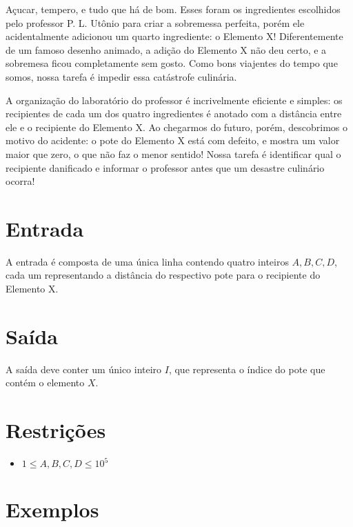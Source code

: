 Açucar, tempero, e tudo que há de bom. Esses foram os ingredientes escolhidos pelo professor P. L. Utônio para criar a sobremessa perfeita,
porém ele acidentalmente adicionou um quarto ingrediente: o Elemento X! Diferentemente de um famoso desenho animado, a adição do Elemento X não deu certo,
e a sobremesa ficou completamente sem gosto. Como bons viajentes do tempo que somos, nossa tarefa é impedir essa catástrofe culinária.

A organização do laboratório do professor é incrivelmente eficiente e simples: os recipientes de cada um dos quatro ingredientes
é anotado com a distância entre ele e o recipiente do Elemento X. Ao chegarmos do futuro, porém, descobrimos o motivo do acidente:
o pote do Elemento X está com defeito, e mostra um valor maior que zero, o que não faz o menor sentido!
Nossa tarefa é identificar qual o recipiente danificado e informar o professor antes que um desastre culinário ocorra!

\section*{Entrada}

A entrada é composta de uma única linha contendo quatro inteiros $A, B, C, D$, cada um representando a distância do respectivo pote
para o recipiente do Elemento X.

\section*{Saída}

A saída deve conter um único inteiro $I$, que representa o índice do pote que contém o elemento $X$.

\section*{Restrições}

\begin{itemize}
\item $ 1 \leq A, B, C, D \leq 10^5$
\end{itemize}


\section*{Exemplos}

\sampleio
